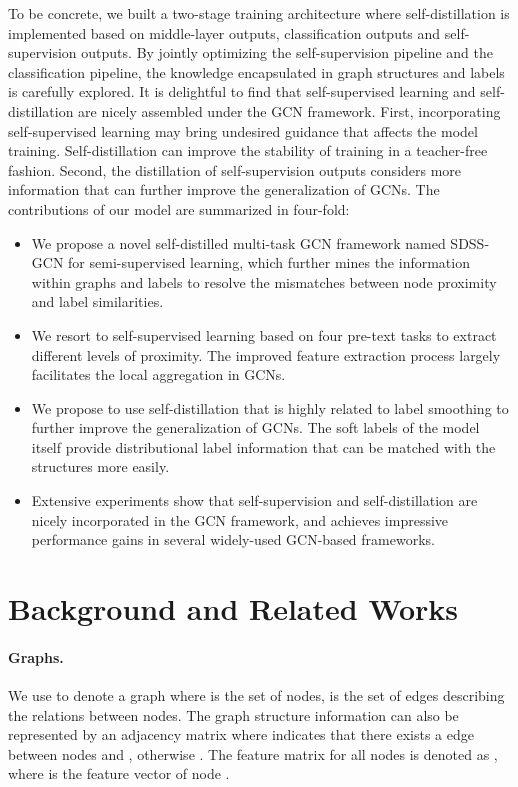 \documentclass[letterpaper]{article} \usepackage{aaai22} \usepackage{times} \usepackage{helvet} \usepackage{courier} \usepackage[hyphens]{url} \usepackage{graphicx} \urlstyle{rm} \def\UrlFont{\rm} \usepackage{subfigure}
\begin{document}
	To be concrete, we built a two-stage training architecture where self-distillation is implemented based on middle-layer outputs, classification outputs and self-supervision outputs. By jointly optimizing the self-supervision pipeline and the classification pipeline, the knowledge encapsulated in graph structures and labels is carefully explored. It is delightful to find that self-supervised learning and self-distillation are nicely assembled under the GCN framework. First, incorporating self-supervised learning may bring undesired guidance that affects the model training. Self-distillation can improve the stability of training in a teacher-free fashion. Second, the distillation of self-supervision outputs considers more information that can further improve the generalization of GCNs. The contributions of our model are summarized in four-fold:
	\begin{itemize}
		\item We propose a novel self-distilled multi-task GCN framework named SDSS-GCN for semi-supervised learning, which further mines the information within graphs and labels to resolve the mismatches between node proximity and label similarities.
		\item We resort to self-supervised learning based on four pre-text tasks to extract different levels of proximity. The improved feature extraction process largely facilitates the local aggregation in GCNs.
		\item We propose to use self-distillation that is highly related to label smoothing to further improve the generalization of GCNs. The soft labels of the model itself provide distributional label information that can be matched with the structures more easily.
		\item Extensive experiments show that self-supervision and self-distillation are nicely incorporated in the GCN framework, and achieves impressive performance gains in several widely-used GCN-based frameworks.
	\end{itemize}
	
	
	\section{Background and Related Works}\label{sec:section2}
	
	\paragraph{Graphs.}\label{sec:section2.1} We use  to denote a graph where  is the set of  nodes,  is the set of edges describing the relations between nodes. The graph structure information can also be represented by an adjacency matrix  where  indicates that there exists a edge between nodes  and , otherwise . The feature matrix for all nodes is denoted as , where  is the feature vector of node .
	
\end{document}
